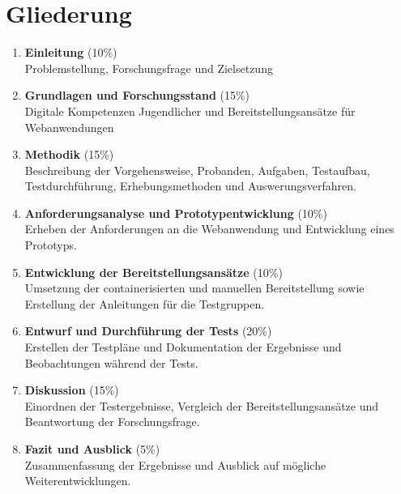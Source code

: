 \documentclass[
    12pt,
    ngerman,
    a4paper,
    oneside
]{book}
\begin{document}
\section*{Gliederung}
\begin{enumerate}[
    label=\arabic*.,
    leftmargin=*,
    itemsep=0.4em,
    topsep=0.2em
]
    \item \textbf{Einleitung} (10\%) \\
    Problemstellung, Forschungsfrage und Zielsetzung

    \item \textbf{Grundlagen und Forschungsstand} (15\%)\\
    Digitale Kompetenzen Jugendlicher und Bereitstellungsansätze für Webanwendungen

    \item \textbf{Methodik} (15\%)\\
    Beschreibung der Vorgehensweise, Probanden, Aufgaben, Testaufbau, Testdurchführung, Erhebungsmethoden und Auswerungsverfahren.
    
    \item \textbf{Anforderungsanalyse und Prototypentwicklung} (10\%)\\
    Erheben der Anforderungen an die Webanwendung und Entwicklung eines Prototyps.
    
    \item \textbf{Entwicklung der Bereitstellungsansätze} (10\%)\\
    Umsetzung der containerisierten und manuellen Bereitstellung sowie Erstellung der Anleitungen für die Testgruppen.
    
    \item \textbf{Entwurf und Durchführung der Tests} (20\%)\\
    Erstellen der Testpläne und Dokumentation der Ergebnisse und Beobachtungen während der Tests.
    
    \item \textbf{Diskussion} (15\%)\\
    Einordnen der Testergebnisse, Vergleich der Bereitstellungsansätze und Beantwortung der Forschungsfrage.
    
    \item \textbf{Fazit und Ausblick} (5\%)\\
    Zusammenfassung der Ergebnisse und Ausblick auf mögliche Weiterentwicklungen.


\end{enumerate}
\end{document}
